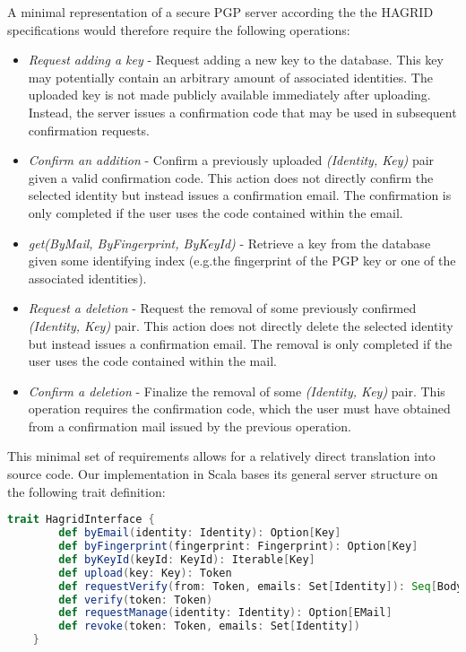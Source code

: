 A minimal representation of a secure PGP server according the the HAGRID specifications would therefore require the following operations:
\begin{itemize}
    \item \emph{Request adding a key} - Request adding a new key to the database. This key may potentially contain an arbitrary amount of associated identities. The uploaded key is not made publicly available immediately after uploading. Instead, the server issues a confirmation code that may be used in subsequent confirmation requests.
    \item \emph{Confirm an addition} - Confirm a previously uploaded \emph{(Identity, Key)} pair given a valid confirmation code. This action does not directly confirm the selected identity but instead issues a confirmation email. The confirmation is only completed if the user uses the code contained within the email.
    \item \emph{get(ByMail, ByFingerprint, ByKeyId)} - Retrieve a key from the database given some identifying index (e.g.the fingerprint of the PGP key or one of the associated identities).
    \item \emph{Request a deletion} - Request the removal of some previously confirmed \emph{(Identity, Key)} pair. This action does not directly delete the selected identity but instead issues a confirmation email. The removal is only completed if the user uses the code contained within the mail.
    \item \emph{Confirm a deletion} - Finalize the removal of some \emph{(Identity, Key)} pair. This operation requires the confirmation code, which the user must have obtained from a confirmation mail issued by the previous operation.
\end{itemize}

This minimal set of requirements allows for a relatively direct translation into source code. Our implementation in Scala bases its general server structure on the following trait definition: 

\begin{lstlisting}[language=Scala]
    trait HagridInterface {
        def byEmail(identity: Identity): Option[Key]
        def byFingerprint(fingerprint: Fingerprint): Option[Key]
        def byKeyId(keyId: KeyId): Iterable[Key]
        def upload(key: Key): Token
        def requestVerify(from: Token, emails: Set[Identity]): Seq[Body]
        def verify(token: Token)
        def requestManage(identity: Identity): Option[EMail]
        def revoke(token: Token, emails: Set[Identity])
    }
\end{lstlisting}


